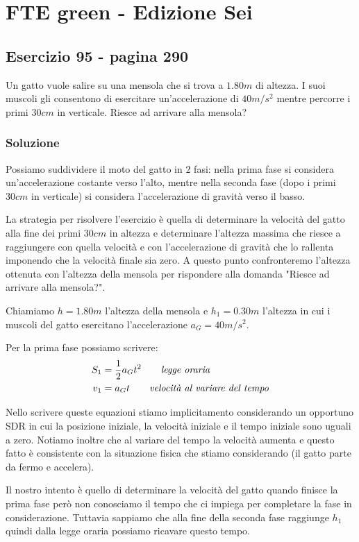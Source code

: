 \documentclass{article}
\begin{document}
\newpage
\section{FTE green - Edizione Sei}
\subsection{Esercizio 95 - pagina 290}
Un gatto vuole salire su una mensola che si trova a $1.80m$ di altezza. I suoi muscoli gli consentono di esercitare un'accelerazione di $40m/s^2$ mentre percorre i primi $30cm$ in verticale. Riesce ad arrivare alla mensola?

\subsubsection{Soluzione}

Possiamo suddividere il moto del gatto in 2 fasi: nella prima fase si considera un'accelerazione costante verso l'alto, mentre nella seconda fase (dopo i primi $30cm$ in verticale) si considera l'accelerazione di gravità verso il basso. 

La strategia per risolvere l'esercizio è quella di determinare la velocità del gatto alla fine dei primi $30cm$ in altezza e determinare l'altezza massima che riesce a raggiungere con quella velocità e con l'accelerazione di gravità che lo rallenta imponendo che la velocità finale sia zero. A questo punto confronteremo l'altezza ottenuta con l'altezza della mensola per rispondere alla domanda "Riesce ad arrivare alla mensola?".

Chiamiamo $h=1.80m$ l'altezza della mensola e $h_1=0.30m$ l'altezza in cui i muscoli del gatto esercitano l'accelerazione $a_G=40m/s^2$.

Per la prima fase possiamo scrivere:
\begin{align}
  S_1 &= \frac{1}{2}a_G t^2 \qquad\text{\textit{legge oraria}} \\
  v_1 &= a_G t \qquad\text{\textit{velocità al variare del tempo}} \label{v1t}
\end{align}

Nello scrivere queste equazioni stiamo implicitamento considerando un opportuno SDR in cui la posizione iniziale, la velocità iniziale e il tempo iniziale sono uguali a zero. Notiamo inoltre che al variare del tempo la velocità aumenta e questo fatto è consistente con la situazione fisica che stiamo considerando (il gatto parte da fermo e accelera).

Il nostro intento è quello di determinare la velocità del gatto quando finisce la prima fase però non conosciamo il tempo che ci impiega per completare la fase in considerazione. Tuttavia sappiamo che alla fine della seconda fase raggiunge $h_1$ quindi dalla legge oraria possiamo ricavare questo tempo.
\end{document}
